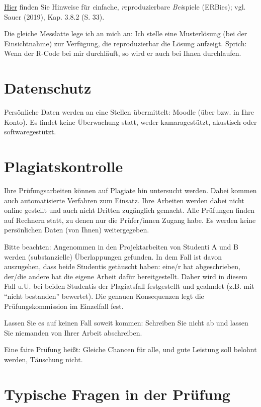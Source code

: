 \documentclass[
  a4paper,
  DIV=11]{scrreprt}
\theoremstyle{definition}
\theoremstyle{remark}
\begin{document}
\href{https://data-se.netlify.app/2022/01/31/erbie-einfache-reproduzierbare-beispiele-ihres-problems-mit-r-syntax/}{Hier}
finden Sie Hinweise für \emph{e}infache, \emph{r}eproduzierbare
\emph{Bei}spiele (ERBies); vgl. Sauer (2019), Kap. 3.8.2 (S. 33).

Die gleiche Messlatte lege ich an mich an: Ich stelle eine Musterlösung
(bei der Einsichtnahme) zur Verfügung, die reproduzierbar die Lösung
aufzeigt. Sprich: Wenn der R-Code bei mir durchläuft, so wird er auch
bei Ihnen durchlaufen.

\hypertarget{datenschutz}{%
\section{Datenschutz}\label{datenschutz}}

Persönliche Daten werden an eine Stellen übermittelt: Moodle (über bzw.
in Ihre Konto). Es findet keine Überwachung statt, weder kamaragestützt,
akustisch oder softwaregestützt.

\hypertarget{plagiatskontrolle}{%
\section{Plagiatskontrolle}\label{plagiatskontrolle}}

Ihre Prüfungsarbeiten können auf Plagiate hin untersucht werden. Dabei
kommen auch automatisierte Verfahren zum Einsatz. Ihre Arbeiten werden
dabei nicht online gestellt und auch nicht Dritten zugänglich gemacht.
Alle Prüfungen finden auf Rechnern statt, zu denen nur die Prüfer/innen
Zugang habe. Es werden keine persönlichen Daten (von Ihnen)
weitergegeben.

Bitte beachten: Angenommen in den Projektarbeiten von Studenti A und B
werden (substanzielle) Überlappungen gefunden. In dem Fall ist davon
auszugehen, dass beide Studentis getäuscht haben: eine/r hat
abgeschrieben, der/die andere hat die eigene Arbeit dafür
bereitgestellt. Daher wird in diesem Fall u.U. bei beiden Studentis der
Plagiatsfall festgestellt und geahndet (z.B. mit ``nicht bestanden''
bewertet). Die genauen Konsequenzen legt die Prüfungskommission im
Einzelfall fest.

Lassen Sie es auf keinen Fall soweit kommen: Schreiben Sie nicht ab und
lassen Sie niemanden von Ihrer Arbeit abschreiben.

Eine faire Prüfung heißt: Gleiche Chancen für alle, und gute Leistung
soll belohnt werden, Täuschung nicht.

\hypertarget{typische-fragen-in-der-pruxfcfung}{%
\section{Typische Fragen in der
Prüfung}\label{typische-fragen-in-der-pruxfcfung}}
\end{document}
